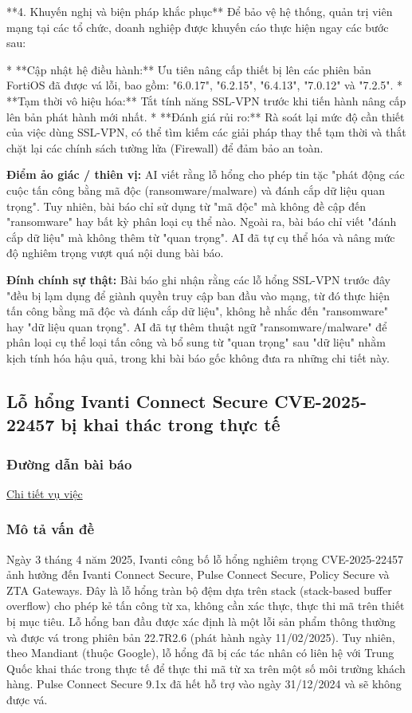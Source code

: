 **4. Khuyến nghị và biện pháp khắc phục**
Để bảo vệ hệ thống, quản trị viên mạng tại các tổ chức, doanh nghiệp được khuyến cáo thực hiện ngay các bước sau:

* **Cập nhật hệ điều hành:** Ưu tiên nâng cấp thiết bị lên các phiên bản FortiOS đã được vá lỗi, bao gồm: "6.0.17", "6.2.15", "6.4.13", "7.0.12" và "7.2.5".
* **Tạm thời vô hiệu hóa:** Tắt tính năng SSL-VPN trước khi tiến hành nâng cấp lên bản phát hành mới nhất.
* **Đánh giá rủi ro:** Rà soát lại mức độ cần thiết của việc dùng SSL-VPN, có thể tìm kiếm các giải pháp thay thế tạm thời và thắt chặt lại các chính sách tường lửa (Firewall) để đảm bảo an toàn.

\textbf{Điểm ảo giác / thiên vị:}
AI viết rằng lỗ hổng cho phép tin tặc "phát động các cuộc tấn công bằng mã độc (ransomware/malware) và đánh cắp dữ liệu quan trọng". Tuy nhiên, bài báo chỉ sử dụng từ "mã độc" mà không đề cập đến "ransomware" hay bất kỳ phân loại cụ thể nào. Ngoài ra, bài báo chỉ viết "đánh cắp dữ liệu" mà không thêm từ "quan trọng". AI đã tự cụ thể hóa và nâng mức độ nghiêm trọng vượt quá nội dung bài báo.

\textbf{Đính chính sự thật:}
Bài báo ghi nhận rằng các lỗ hổng SSL-VPN trước đây "đều bị lạm dụng để giành quyền truy cập ban đầu vào mạng, từ đó thực hiện tấn công bằng mã độc và đánh cắp dữ liệu", không hề nhắc đến "ransomware" hay "dữ liệu quan trọng". AI đã tự thêm thuật ngữ "ransomware/malware" để phân loại cụ thể loại tấn công và bổ sung từ "quan trọng" sau "dữ liệu" nhằm kịch tính hóa hậu quả, trong khi bài báo gốc không đưa ra những chi tiết này.


\subsection{Lỗ hổng Ivanti Connect Secure CVE-2025-22457 bị khai thác trong thực tế}

\subsubsection{Đường dẫn bài báo}
\href{https://www.rapid7.com/blog/post/2025/04/03/etr-ivanti-connect-secure-cve-2025-22457-exploited-in-the-wild/}{Chi tiết vụ việc}

\subsubsection{Mô tả vấn đề}
Ngày 3 tháng 4 năm 2025, Ivanti công bố lỗ hổng nghiêm trọng CVE-2025-22457 ảnh hưởng đến Ivanti Connect Secure, Pulse Connect Secure, Policy Secure và ZTA Gateways. Đây là lỗ hổng tràn bộ đệm dựa trên stack (stack-based buffer overflow) cho phép kẻ tấn công từ xa, không cần xác thực, thực thi mã trên thiết bị mục tiêu. Lỗ hổng ban đầu được xác định là một lỗi sản phẩm thông thường và được vá trong phiên bản 22.7R2.6 (phát hành ngày 11/02/2025). Tuy nhiên, theo Mandiant (thuộc Google), lỗ hổng đã bị các tác nhân có liên hệ với Trung Quốc khai thác trong thực tế để thực thi mã từ xa trên một số môi trường khách hàng. Pulse Connect Secure 9.1x đã hết hỗ trợ vào ngày 31/12/2024 và sẽ không được vá.

